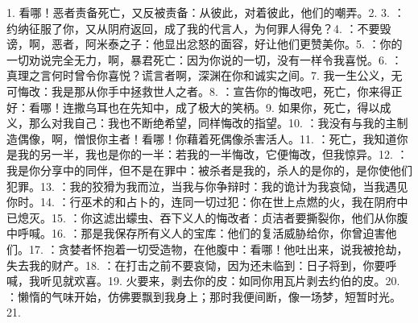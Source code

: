 1. 看哪！恶者责备死亡，又反被责备：从彼此，对着彼此，他们的嘲弄。\newline{}2. \newline{}3. ：约纳征服了你，又从阴府返回，成了我的代言人，为何罪人得免？\newline{}4. ：不要毁谤，啊，恶者，阿米泰之子：他显出忿怒的面容，好让他们更赞美你。\newline{}5. ：你的一切劝说完全无力，啊，暴君死亡：因为你说的一切，没有一样令我喜悦。\newline{}6. ：真理之言何时曾令你喜悦？谎言者啊，深渊在你和诚实之间。\newline{}7. 我一生公义，无可悔改：我是那从你手中拯救世人之者。\newline{}8. ：宣告你的悔改吧，死亡，你来得正好：看哪！连撒乌耳也在先知中，成了极大的笑柄。\newline{}9. 如果你，死亡，得以成义，那么对我自己：我也不断绝希望，同样悔改的指望。\newline{}10. ：我没有与我的主制造偶像，啊，憎恨你主者！看哪！你藉着死偶像杀害活人。\newline{}11. ：死亡，我知道你是我的另一半，我也是你的一半：若我的一半悔改，它便悔改，但我惊异。\newline{}12. ：我是你分享中的同伴，但不是在罪中：被杀者是我的，杀人的是你的，是你使他们犯罪。\newline{}13. ：我的狡猾为我而泣，当我与你争辩时：我的诡计为我哀恸，当我遇见你时。\newline{}14. ：行巫术的和占卜的，连同一切过犯：你在世上点燃的火，我在阴府中已熄灭。\newline{}15. ：你这滤出蠓虫、吞下义人的悔改者：贞洁者要撕裂你，他们从你腹中呼喊。\newline{}16. ：那是我保存所有义人的宝库：他们的复活威胁给你，你曾迫害他们。\newline{}17. ：贪婪者怀抱着一切受造物，在他腹中：看哪！他吐出来，说我被抢劫，失去我的财产。\newline{}18. ：在打击之前不要哀恸，因为还未临到：日子将到，你要呼喊，我听见就欢喜。\newline{}19. 火要来，剥去你的皮：如同你用瓦片剥去约伯的皮。\newline{}20. ：懒惰的气味开始，仿佛要飘到我身上；那时我便间断，像一场梦，短暂时光。\newline{}21. 